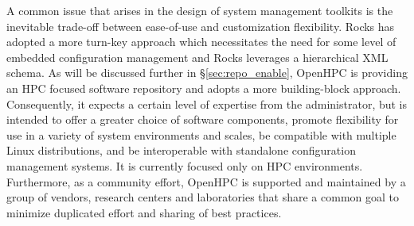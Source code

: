 A common issue that arises in the design of system management toolkits is the
inevitable trade-off between ease-of-use and customization flexibility. Rocks
has adopted a more turn-key approach which necessitates the need for some level
of embedded configuration management and Rocks leverages a hierarchical XML
schema. As will be discussed further in \S\ref{sec:repo_enable}, OpenHPC is
providing an HPC focused software repository and adopts a more building-block
approach. Consequently, it expects a certain level of expertise from the
administrator, but is intended to offer a greater choice of software
components, promote flexibility for use in a variety of system environments
and scales, be compatible with multiple Linux distributions, and be
interoperable with standalone configuration management systems. It is currently 
focused only on HPC environments. Furthermore, as
a community effort, OpenHPC is supported and maintained by a group of vendors,
research centers and laboratories that share a common goal to minimize
duplicated effort and sharing of best practices.

